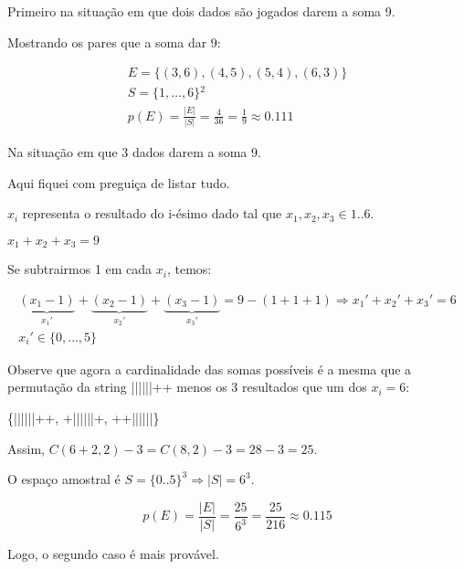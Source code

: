 \item
Primeiro na situação em que dois dados são jogados darem a soma 9.

Mostrando os pares que a soma dar 9:

\[\begin{array}{l}
E = \{ (3,6),(4,5),(5,4),(6,3)\} \\
S = \{ 1, \ldots ,6\} {^2}\\
p(E) = \frac{{|E|}}{{|S|}} = \frac{4}{{36}} = \frac{1}{9} \approx 0.111
\end{array}\]

Na situação em que 3 dados darem a soma 9.

Aqui fiquei com preguiça de listar tudo.

$x_i$ representa o resultado do i-ésimo dado tal que $x_1,x_2,x_3 \in {1..6}$.

$x_1 + x_2 + x_3 = 9$

Se subtrairmos 1 em cada $x_i$, temos:

\[\begin{array}{l}
\underbrace {({x_1} - 1)}_{{x_1}'} + \underbrace {({x_2} - 1)}_{{x_2}'} + \underbrace {({x_3} - 1)}_{{x_3}'} = 9 - (1 + 1 + 1) \Rightarrow {x_1}' + {x_2}' + {x_3}' = 6\\
{x_i}' \in \{ 0, \ldots ,5\}
\end{array}\]

Observe que agora a cardinalidade das somas possíveis é a mesma que a permutação
da string ||||||++ menos os 3 resultados que um dos $x_i = 6$:

\{||||||++, +||||||+, ++||||||\}

Assim, $C(6 + 2,2) - 3 = C(8,2) - 3 = 28 - 3 = 25$.

O espaço amostral é $S=\{0..5\}^3 \Rightarrow |S|=6^3$.

\[p(E) = \frac{{|E|}}{{|S|}} = \frac{{25}}{{{6^3}}} = \frac{{25}}{{216}} \approx 0.115\]

Logo, o segundo caso é mais provável.
